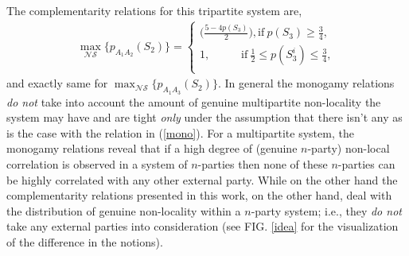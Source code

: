 \documentclass[%
 reprint,
 amsmath,amssymb,
 aps,
]{revtex4-1}
\theoremstyle{plain}
\begin{document}
The complementarity relations for this tripartite system are,
\begin{eqnarray}
\label{nvn31}
  \max_{\mathcal{NS}}\{p_{A_1A_2}({S_{2}})\} =
    \begin{cases}
       \bigg( \frac{5-4p(S_{3})}{2} \bigg),  \text{if}\ p(S_{3}) \geq \frac{3}{4}, \\
      1, \;\;\;\;\;\;\;\;\;\; \text{if}\ \frac{1}{2}\leq  p(S_{3}^i) \leq \frac{3}{4},  \\
    \end{cases}{}
\end{eqnarray} and exactly same for $\max_{\mathcal{NS}}\{p_{A_1A_3}({S_{2}})\}$.
In general the monogamy relations \textit{do not} take into account the amount of genuine multipartite non-locality the system may have and are tight \textit{only} under the assumption that there isn't any as is the case with the relation in (\ref{mono}). For a multipartite system, the monogamy relations reveal that if a high degree of (genuine $n$-party) non-local correlation is observed in a system of $n$-parties then none of these $n$-parties can be highly correlated with any other external party. While on the other hand the complementarity relations presented in this work, on the other hand, deal with the distribution of genuine non-locality within a $n$-party system; i.e., they \textit{do not} take any external parties into consideration (see FIG. \ref{idea} for the visualization of the difference in the notions).
\end{document}
